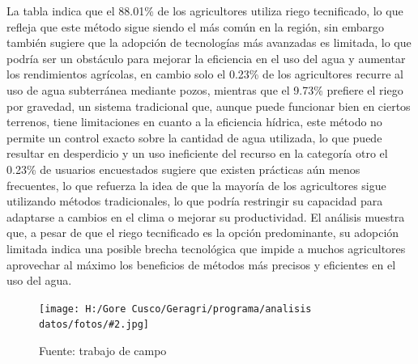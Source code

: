 \documentclass{article}\usepackage[]{graphicx}\usepackage[table]{xcolor}
\newenvironment{fotos}[2]
{\begin{figure}[H]
	\centering
	\caption{#1}
	\texttt{[image: H:/Gore Cusco/Geragri/programa/analisis datos/fotos/\#2.jpg]}
	\caption*{Fuente: trabajo de campo}}
{\end{figure}}
\begin{document}
La tabla indica que el 88.01\% de los agricultores utiliza riego tecnificado, lo que refleja que este método sigue siendo el más común en la región, sin embargo también sugiere que la adopción de tecnologías más avanzadas es limitada, lo que podría ser un obstáculo para mejorar la eficiencia en el uso del agua y aumentar los rendimientos agrícolas, en cambio solo el 0.23\% de los agricultores recurre al uso de agua subterránea mediante pozos, mientras que el 9.73\% prefiere el riego por gravedad, un sistema tradicional que, aunque puede funcionar bien en ciertos terrenos, tiene limitaciones en cuanto a la eficiencia hídrica, este método no permite un control exacto sobre la cantidad de agua utilizada, lo que puede resultar en desperdicio y un uso ineficiente del recurso en la categoría otro el 0.23\% de usuarios encuestados sugiere que existen prácticas aún menos frecuentes, lo que refuerza la idea de que la mayoría de los agricultores sigue utilizando métodos tradicionales, lo que podría restringir su capacidad para adaptarse a cambios en el clima o mejorar su productividad. El análisis muestra que, a pesar de que el riego tecnificado es la opción predominante, su adopción limitada indica una posible brecha tecnológica que impide a muchos agricultores aprovechar al máximo los beneficios de métodos más precisos y eficientes en el uso del agua.
\begin{fotos}
{reconocimiento en campo}{22}
\end{fotos}
\end{document}
